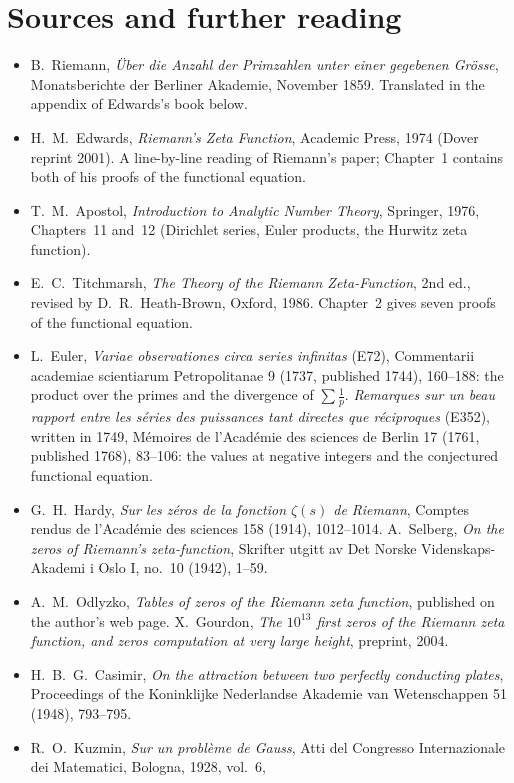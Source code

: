 \section*{Sources and further reading}

\begin{itemize}
\item B.~Riemann, \emph{\"Uber die Anzahl der Primzahlen unter einer gegebenen Gr\"osse}, Monatsberichte der Berliner
Akademie, November 1859. Translated in the appendix of Edwards's book below.
\item H.~M.~Edwards, \emph{Riemann's Zeta Function}, Academic Press, 1974 (Dover reprint 2001). A line-by-line reading of
Riemann's paper; Chapter~1 contains both of his proofs of the functional equation.
\item T.~M.~Apostol, \emph{Introduction to Analytic Number Theory}, Springer, 1976, Chapters~11 and~12 (Dirichlet series,
Euler products, the Hurwitz zeta function).
\item E.~C.~Titchmarsh, \emph{The Theory of the Riemann Zeta-Function}, 2nd ed., revised by D.~R.~Heath-Brown, Oxford, 1986.
Chapter~2 gives seven proofs of the functional equation.
\item L.~Euler, \emph{Variae observationes circa series infinitas} (E72), Commentarii academiae scientiarum Petropolitanae 9
(1737, published 1744), 160--188: the product over the primes and the divergence of $\sum\frac1p$. \emph{Remarques sur un beau rapport
entre les s\'eries des puissances tant directes que r\'eciproques} (E352), written in 1749, M\'emoires de l'Acad\'emie des sciences de
Berlin 17 (1761, published 1768), 83--106: the values at negative integers and the conjectured functional equation.
\item G.~H.~Hardy, \emph{Sur les z\'eros de la fonction $\zeta(s)$ de Riemann}, Comptes rendus de l'Acad\'emie des sciences 158 (1914),
1012--1014. A.~Selberg, \emph{On the zeros of Riemann's zeta-function}, Skrifter utgitt av Det Norske Videnskaps-Akademi i Oslo I,
no.~10 (1942), 1--59.
\item A.~M.~Odlyzko, \emph{Tables of zeros of the Riemann zeta function}, published on the author's web page. X.~Gourdon,
\emph{The $10^{13}$ first zeros of the Riemann zeta function, and zeros computation at very large height}, preprint, 2004.
\item H.~B.~G.~Casimir, \emph{On the attraction between two perfectly conducting plates}, Proceedings of the Koninklijke
Nederlandse Akademie van Wetenschappen 51 (1948), 793--795.
\item R.~O.~Kuzmin, \emph{Sur un probl\`eme de Gauss}, Atti del Congresso Internazionale dei Matematici, Bologna, 1928, vol.~6,

\end{itemize}
